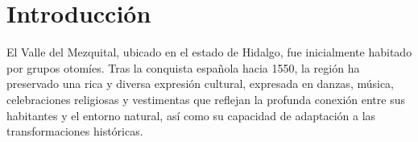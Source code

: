 \section{Introducción}





El Valle del Mezquital, ubicado en el estado de Hidalgo, fue inicialmente habitado por grupos otomíes. Tras la conquista española hacia 1550, la región ha preservado una rica y diversa expresión cultural, expresada en danzas, música, celebraciones religiosas y vestimentas que reflejan la profunda conexión entre sus habitantes y el entorno natural, así como su capacidad de adaptación a las transformaciones históricas.

